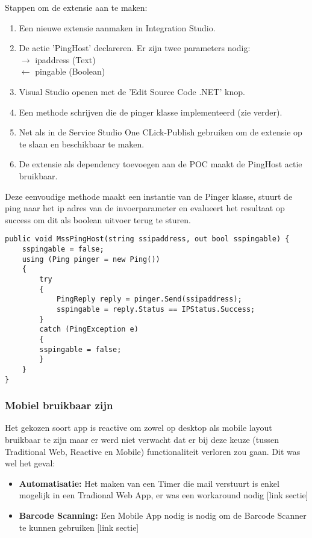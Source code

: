 Stappen om de extensie aan te maken:
\begin{enumerate}
    \item Een nieuwe extensie aanmaken in Integration Studio.
    \item De actie 'PingHost' declareren. Er zijn twee parameters nodig:\\
    $\rightarrow$ ipaddress (Text)\\
    $\leftarrow$ pingable (Boolean)
    \item Visual Studio openen met de 'Edit Source Code .NET' knop.
    \item Een methode schrijven die de pinger klasse implementeerd (zie verder).
    \item Net als in de Service Studio One CLick-Publish gebruiken om de extensie op te slaan en beschikbaar te maken.
    \item De extensie als dependency toevoegen aan de POC maakt de PingHost actie bruikbaar.
\end{enumerate}

Deze eenvoudige methode maakt een instantie van de Pinger klasse, stuurt de ping naar het ip adres van de invoerparameter en evalueert het resultaat op success om dit als boolean uitvoer terug te sturen. 
\begin{lstlisting}[style=CSharpStyle]
public void MssPingHost(string ssipaddress, out bool sspingable) {
    sspingable = false;
    using (Ping pinger = new Ping())
    {
        try
        {
            PingReply reply = pinger.Send(ssipaddress);
            sspingable = reply.Status == IPStatus.Success;
        }
        catch (PingException e)
        {
        sspingable = false;
        }
    }
}
\end{lstlisting}

\subsubsection{Mobiel bruikbaar zijn}

Het gekozen soort app is reactive om zowel op desktop als mobile layout bruikbaar te zijn maar er werd niet verwacht dat er bij deze keuze (tussen Traditional Web, Reactive en Mobile) functionaliteit verloren zou gaan. Dit was wel het geval:
\begin{itemize}
    \item \textbf{Automatisatie:} Het maken van een Timer die mail verstuurt is enkel mogelijk in een Tradional Web App, er was een workaround nodig [link sectie]
    \item \textbf{Barcode Scanning:} Een Mobile App nodig is nodig om de Barcode Scanner te kunnen gebruiken [link sectie]
\end{itemize}

